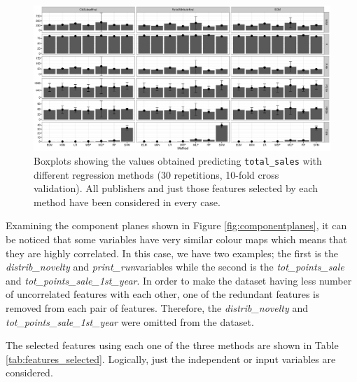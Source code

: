 \documentclass[a4paper,10pt,twocolumn,preprint,3p]{elsarticle}
\begin{document}
\begin{figure}[ht]
\begin{center}
\includegraphics[scale=0.4]{./imgs/prediction_all_publisher_Table5.eps}
\end{center}
\caption{Boxplots showing the values obtained predicting \texttt{total\_sales} with different regression methods (30 repetitions, 10-fold cross validation). All publishers and just those features selected by each method have been considered in every case.}
\label{fig:results_all_publishers_fs}
\end{figure}


Examining the component planes shown in Figure \ref{fig:componentplanes}, it can be noticed that some variables have very similar colour maps which means that they are highly correlated. In this case, we have two examples; the first is the \emph{distrib\_novelty} and \emph{print\_run}variables while the second is the \emph{tot\_points\_sale} and \emph{tot\_points\_sale\_1st\_year}. In order to make the dataset having less number of uncorrelated features with each other, one of the redundant features is removed from each pair of features. Therefore, the \emph{distrib\_novelty} and \emph{tot\_points\_sale\_1st\_year} were omitted from the dataset.


The selected features using each one of the three methods are shown in 
Table \ref{tab:features_selected}.
Logically, just the independent or input variables are considered.
\end{document}
